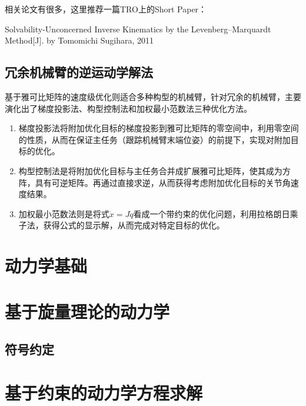 相关论文有很多，这里推荐一篇TRO上的Short Paper：

Solvability-Unconcerned Inverse Kinematics by the Levenberg–Marquardt Method[J]. by Tomomichi Sugihara, 2011


\section{冗余机械臂的逆运动学解法}
基于雅可比矩阵的速度级优化则适合多种构型的机械臂，针对冗余的机械臂，主要演化出了梯度投影法、构型控制法和加权最小范数法三种优化方法。
\begin{enumerate}
  \item 梯度投影法将附加优化目标的梯度投影到雅可比矩阵的零空间中，利用零空间的性质，从而在保证主任务（跟踪机械臂末端位姿）的前提下，实现对附加目标的优化。
  \item 构型控制法是将附加优化目标与主任务合并成扩展雅可比矩阵，使其成为方阵，具有可逆矩阵。再通过直接求逆，从而获得考虑附加优化目标的关节角速度结果。
  \item 加权最小范数法则是将式$\dot{x} = J\dot{q}$看成一个带约束的优化问题，利用拉格朗日乘子法，获得公式的显示解，从而完成对特定目标的优化。
\end{enumerate}



\chapter{动力学基础}
\chapter{基于旋量理论的动力学}
\section{符号约定}
\section{}
\chapter{基于约束的动力学方程求解}
